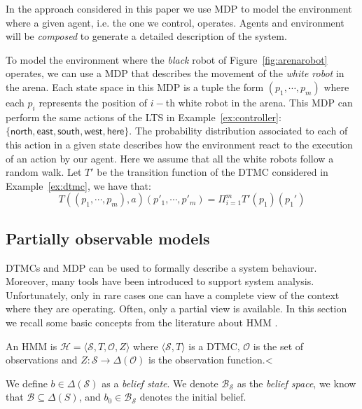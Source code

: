 In the approach considered in this paper we use \ac{MDP} to model the environment where a given agent, i.e. the one 
we control, operates. Agents and environment will be \emph{composed} to generate a detailed description of the system.
\begin{example}
\label{ex:environment}
To model the environment where the \emph{black} robot of Figure~\ref{fig:arenarobot} operates, we can use a \ac{MDP} that 
describes the movement of the \emph{white robot} in the arena. Each state space in this \ac{MDP} is a tuple the form $(p_1,\cdots,p_m)$
where each $p_i$ represents the position of $i-$th white robot in the arena. This \ac{MDP} can perform the same actions of the \ac{LTS} in Example~\ref{ex:controller}:  $\{ \mathsf{north} , \mathsf{east}, \mathsf{south}, \mathsf{west}, \mathsf{here} \}$. The probability distribution associated to each of this action in a given state describes how
the environment react to the execution of an action by our agent. Here we assume that all the white robots follow a random walk. 
Let $T'$ be the transition function of the DTMC considered in Example~\ref{ex:dtmc}, we have that:
\[
T((p_1,\cdots,p_m),a)(p'_1,\cdots,p'_m)=\Pi_{i=1}^{m}T'(p_1)(p_1')
\]
\end{example}


\subsection*{Partially observable models} %
\label{sub:partially_observable_models}

\ac{DTMC}s and \ac{MDP} can be used to formally describe a system behaviour. Moreover, many tools have been introduced to
support system analysis. Unfortunately, only in rare cases one can have a complete view of the context where they are operating. 
Often, only a partial view is available. 
%
In this section we recall some basic concepts from the literature about \ac{HMM} \cite{ZhangHJ05}.

\begin{definition}[\ac{HMM}]
An \ac{HMM} is $\mathcal{H} = \langle \mathcal{S}, T, \mathcal{O}, Z \rangle$
where $\langle \mathcal{S}, T \rangle$ is a \ac{DTMC}, $\mathcal{O}$ is the set of observations and $Z : \mathcal{S} \rightarrow \Delta(\mathcal{O})$ is the observation function.<
\end{definition}
%
%
We define $b \in \Delta(\mathcal{S})$ as a \emph{belief state}. We denote $\mathcal{B}_{\mathcal{S}}$ as the \emph{belief space}, we know that $\mathcal{B} \subseteq \Delta(S)$, and $b_0 \in \mathcal{B}_\mathcal{S}$ denotes the initial belief. 

